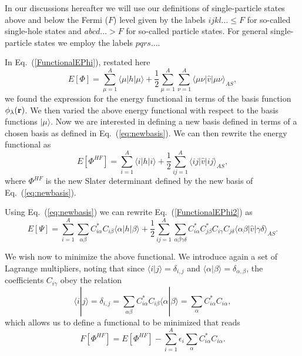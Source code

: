\documentclass[%
oneside,                 %
final,                   %
10pt]{article}
\begin{document}
In our discussions hereafter we will use our definitions of single-particle states above and below the Fermi ($F$) level given by the labels
$ijkl\dots \le F$ for so-called single-hole states and $abcd\dots > F$ for so-called particle states.
For general single-particle states we employ the labels $pqrs\dots$. 




In Eq.~(\ref{FunctionalEPhi}), restated here
\[
  E[\Phi] 
  = \sum_{\mu=1}^A \langle \mu | h | \mu \rangle +
  \frac{1}{2}\sum_{{\mu}=1}^A\sum_{{\nu}=1}^A \langle \mu\nu|\hat{v}|\mu\nu\rangle_{AS},
\]
we found the expression for the energy functional in terms of the basis function $\phi_{\lambda}({\bf r})$. We then  varied the above energy functional with respect to the basis functions $|\mu \rangle$. 
Now we are interested in defining a new basis defined in terms of
a chosen basis as defined in Eq.~(\ref{eq:newbasis}). We can then rewrite the energy functional as
\begin{equation}
  E[\Phi^{HF}] 
  = \sum_{i=1}^A \langle i | h | i \rangle +
  \frac{1}{2}\sum_{ij=1}^A\langle ij|\hat{v}|ij\rangle_{AS}, \label{FunctionalEPhi2}
\end{equation}
where $\Phi^{HF}$ is the new Slater determinant defined by the new basis of Eq.~(\ref{eq:newbasis}). 





Using Eq.~(\ref{eq:newbasis}) we can rewrite Eq.~(\ref{FunctionalEPhi2}) as 
\begin{equation}
  E[\Psi] 
  = \sum_{i=1}^A \sum_{\alpha\beta} C^*_{i\alpha}C_{i\beta}\langle \alpha | h | \beta \rangle +
  \frac{1}{2}\sum_{ij=1}^A\sum_{{\alpha\beta\gamma\delta}} C^*_{i\alpha}C^*_{j\beta}C_{i\gamma}C_{j\delta}\langle \alpha\beta|\hat{v}|\gamma\delta\rangle_{AS}. \label{FunctionalEPhi3}
\end{equation}





We wish now to minimize the above functional. We introduce again a set of Lagrange multipliers, noting that
since $\langle i | j \rangle = \delta_{i,j}$ and $\langle \alpha | \beta \rangle = \delta_{\alpha,\beta}$, 
the coefficients $C_{i\gamma}$ obey the relation
\[
 \langle i | j \rangle=\delta_{i,j}=\sum_{\alpha\beta} C^*_{i\alpha}C_{i\beta}\langle \alpha | \beta \rangle=
\sum_{\alpha} C^*_{i\alpha}C_{i\alpha},
\]
which allows us to define a functional to be minimized that reads
\begin{equation}
  F[\Phi^{HF}]=E[\Phi^{HF}] - \sum_{i=1}^A\epsilon_i\sum_{\alpha} C^*_{i\alpha}C_{i\alpha}.
\end{equation}
\end{document}
